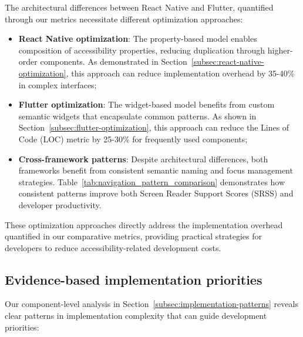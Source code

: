 The architectural differences between React Native and Flutter, quantified through our metrics necessitate different optimization approaches:

\begin{itemize}
    \item \textbf{React Native optimization}: The property-based model enables composition of accessibility properties, reducing duplication through higher-order components. As demonstrated in Section~\ref{subsec:react-native-optimization}, this approach can reduce implementation overhead by 35-40\% in complex interfaces;

    \item \textbf{Flutter optimization}: The widget-based model benefits from custom semantic widgets that encapsulate common patterns. As shown in Section~\ref{subsec:flutter-optimization}, this approach can reduce the Lines of Code (LOC) metric by 25-30\% for frequently used components;

    \item \textbf{Cross-framework patterns}: Despite architectural differences, both frameworks benefit from consistent semantic naming and focus management strategies. Table~\ref{tab:navigation_pattern_comparison} demonstrates how consistent patterns improve both Screen Reader Support Scores (SRSS) and developer productivity.
\end{itemize}

These optimization approaches directly address the implementation overhead quantified in our comparative metrics, providing practical strategies for developers to reduce accessibility-related development costs.

\subsection{Evidence-based implementation priorities}
\label{subsec:implications-priorities}

Our component-level analysis in Section~\ref{subsec:implementation-patterns} reveals clear patterns in implementation complexity that can guide development priorities:

